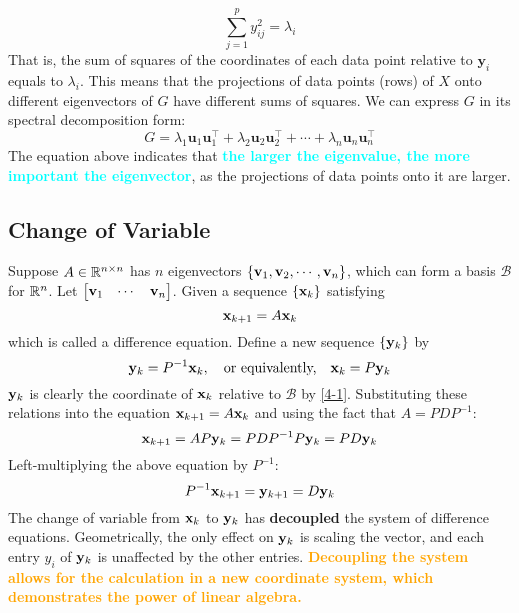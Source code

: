     \begin{equation*}
        \sum_{j = 1}^{p} y_{ij}^2 = \lambda_i
    \end{equation*}
    That is, the sum of squares of the coordinates of each data point relative to $\mathbf{y}_i$ equals to $\lambda_i$. This means that the projections of data points (rows) of $X$ onto different eigenvectors of $G$ have different sums of squares. We can express $G$ in its spectral decomposition form:
    \begin{equation}
        G = \lambda_1\mathbf{u}_1\mathbf{u}_1^{\top} + \lambda_2\mathbf{u}_2\mathbf{u}_2^{\top} + \cdots + \lambda_n\mathbf{u}_n\mathbf{u}_n^{\top}
    \end{equation}
    The equation above indicates that \textbf{\textcolor{cyan}{the larger the eigenvalue, the more important the eigenvector}}, as the projections of data points onto it are larger.

    \subsection{Change of Variable}
    Suppose $A\in\mathbb{R}^{n\times n}$ has $n$ eigenvectors $\{\mathbf{v}_1, \mathbf{v}_2, \cdots, \mathbf{v}_n \}$, which can form a basis $\mathcal{B}$ for $\mathbb{R}^n$. Let $\begin{bmatrix}
        \mathbf{v}_1 & \cdots & \mathbf{v}_n
    \end{bmatrix}$. Given a sequence $\{\mathbf{x}_k\}$ satisfying 
    \begin{equation*}
        \mathbf{x}_{k + 1} = A\mathbf{x}_k
    \end{equation*} which is called a difference equation. Define a new sequence $\{\mathbf{y}_{k}\}$ by
    \begin{equation*}
        \mathbf{y}_{k} = P^{-1}\mathbf{x}_k,\quad \text{or equivalently,}\quad \mathbf{x}_k = P\mathbf{y}_k    \end{equation*}
    $\mathbf{y}_{k}$ is clearly the coordinate of $\mathbf{x}_k$ relative to $\mathcal{B}$ by \cref{4-1}.
    Substituting these relations into the equation $\mathbf{x}_{k + 1} = A\mathbf{x}_k$ and using the fact that $A = PDP^{-1}$:
    \begin{equation*}
        \mathbf{x}_{k + 1} = AP\mathbf{y}_{k} = PDP^{-1}P\mathbf{y}_k = PD\mathbf{y}_{k}
    \end{equation*}
    Left-multiplying the above equation by $P^{-1}$:
    \begin{equation*}
        P^{-1}\mathbf{x}_{k + 1} =\mathbf{y}_{k + 1} =  D\mathbf{y}_k
    \end{equation*}
    The change of variable from $\mathbf{x}_k$ to $\mathbf{y}_k$ has \textbf{decoupled} the system of difference equations. Geometrically, the only effect on $\mathbf{y}_k$ is scaling the vector, and each entry $y_{i}$ of $\mathbf{y}_k$ is unaffected by the other entries. \textbf{\textcolor{orange}{Decoupling the system allows for the calculation in a new coordinate system, which demonstrates the power of linear algebra.}}